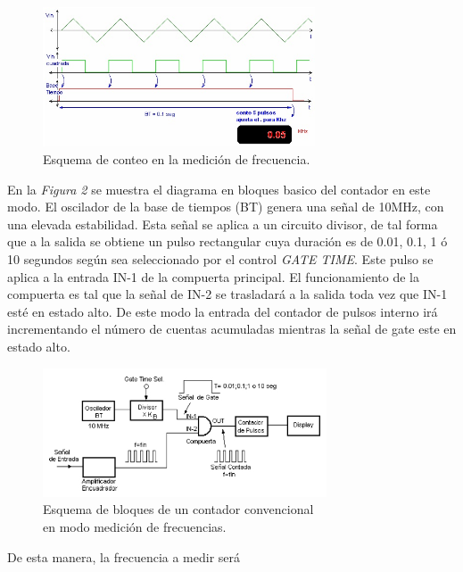 \documentclass{article}
\begin{document}
\begin{figure}[h]
	\centering
	\includegraphics[width=0.72\textwidth]{images/01-ondasFrecuenciaContador.jpg}
	\medskip
	\caption{Esquema de conteo en la medición de frecuencia.}
\end{figure}
\bigskip\bigskip

	
	En la \textit{Figura 2} se muestra el diagrama en bloques basico del contador en este modo. El oscilador de la base de tiempos (BT) genera una señal de 10MHz, con una elevada estabilidad. Esta señal se aplica a un circuito divisor, de tal forma que a la salida se obtiene un pulso rectangular cuya duración es de 0.01, 0.1, 1 ó 10 segundos según sea seleccionado por el control \textit{GATE TIME}. Este pulso se aplica a la entrada IN-1 de la compuerta principal. El funcionamiento de la compuerta es tal que la señal de IN-2 se trasladará a la salida toda vez que IN-1 esté en estado alto. De este modo la entrada del contador de pulsos interno irá incrementando el número de cuentas acumuladas mientras la señal de gate este en estado alto. 


\newpage
\begin{figure}[h]
	\centering
	\includegraphics[width=0.75\textwidth]{images/02-diagrama-en-bloques-modo-medicion-frecuencia.jpg}
	\medskip
	\caption{Esquema de bloques de un contador convencional\\ en modo medición de frecuencias.}
\end{figure}
\bigskip\bigskip


	De esta manera, la frecuencia a medir será
\medskip
\end{document}
